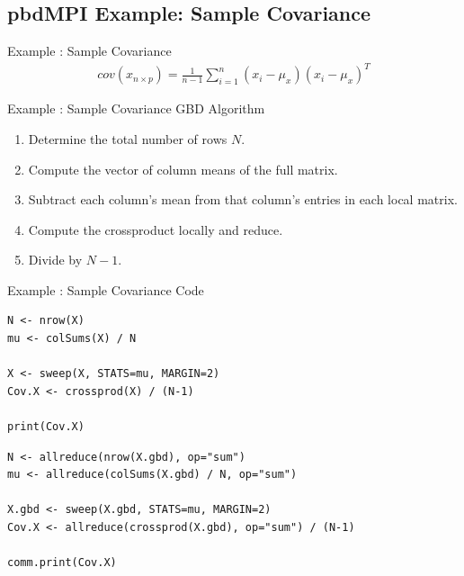 \subsection{pbdMPI Example: Sample Covariance}

\begin{frame}
  \begin{block}{Example \countex :  Sample Covariance}\pause
  \begin{align*}
    cov(x_{n\times p}) = \frac{1}{n-1}\sum_{i=1}^n\left(x_i-\mu_x\right)\left(x_i-\mu_x\right)^T
  \end{align*}
  \end{block}
\end{frame}


\begin{frame}
  \begin{block}{Example \showex :  Sample Covariance GBD Algorithm}\pause
    \begin{enumerate}
     \item Determine the total number of rows $N$.
     \item Compute the vector of column means of the full matrix.
     \item Subtract each column's mean from that column's entries in each local matrix.
     \item Compute the crossproduct locally and reduce.
     \item Divide by $N-1$.
    \end{enumerate}
  \end{block}
\end{frame}


\begin{frame}
  \begin{exampleblock}{Example \showex :  Sample Covariance Code}\pause
\begin{lstlisting}[title=Serial Code]
N <- nrow(X)
mu <- colSums(X) / N

X <- sweep(X, STATS=mu, MARGIN=2)
Cov.X <- crossprod(X) / (N-1)

print(Cov.X)
\end{lstlisting}
  
\begin{lstlisting}[title=Parallel Code]
N <- allreduce(nrow(X.gbd), op="sum")
mu <- allreduce(colSums(X.gbd) / N, op="sum")

X.gbd <- sweep(X.gbd, STATS=mu, MARGIN=2)
Cov.X <- allreduce(crossprod(X.gbd), op="sum") / (N-1)

comm.print(Cov.X)
\end{lstlisting}
  \end{exampleblock}
\end{frame}







